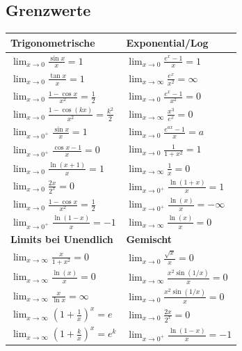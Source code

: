 \begin{flushleft}
 
 \subsection{Grenzwerte}

\begin{center}
  \begin{tabularx}{\linewidth}{XX}
    \toprule
    \textbf{Trigonometrische} & \textbf{Exponential/Log} \\
    \midrule
    $\lim_{x \to 0} \frac{\sin x}{x} = 1$ & $\lim_{x \to 0} \frac{e^x - 1}{x} = 1$ \\
    $\lim_{x \to 0} \frac{\tan x}{x} = 1$ & $\lim_{x \to \infty} \frac{e^x}{x^2} = \infty$ \\
    $\lim_{x \to 0} \frac{1 - \cos x}{x^2} = \frac{1}{2}$ & $\lim_{x \to 0} \frac{e^x - 1}{x^2} = 0$ \\
    $\lim_{x \to 0} \frac{1 - \cos(kx)}{x^2} = \frac{k^2}{2}$ & $\lim_{x \to \infty} \frac{x^3}{e^x} = 0$ \\
    $\lim_{x \to 0^+} \frac{\sin x}{x} = 1$ & $\lim_{x \to 0} \frac{e^{ax} - 1}{x} = a$ \\
    $\lim_{x \to 0^+} \frac{\cos x - 1}{x} = 0$ & $\lim_{x \to 0} \frac{1}{1 + x^2} = 1$ \\
    $\lim_{x \to 0} \frac{\ln(x+1)}{x} = 1$ & $\lim_{x \to \infty} \frac{1}{x} = 0$ \\
    $\lim_{x \to 0} \frac{2x}{2^x} = 0$ & $\lim_{x \to 0^+} \frac{\ln(1+x)}{x} = 1$ \\
    $\lim_{x \to 0} \frac{1 - \cos x}{x^2} = \frac{1}{2}$ & $\lim_{x \to 0^+} \frac{\ln(x)}{x} = -\infty$ \\
    $\lim_{x \to 0^+} \frac{\ln(1 - x)}{x} = -1$ & $\lim_{x \to \infty} \frac{\ln(x)}{x} = 0$ \\
    \midrule
    \textbf{Limits bei Unendlich} & \textbf{Gemischt} \\
    \midrule
    $\lim_{x \to \infty} \frac{x}{1+x^2} = 0$ & $\lim_{x \to 0} \frac{\sqrt{x}}{x} = 0$ \\
    $\lim_{x \to \infty} \frac{\ln(x)}{x} = 0$ & $\lim_{x \to \infty} \frac{x^2 \sin(1/x)}{x} = 0$ \\
    $\lim_{x \to \infty} \frac{x}{\ln x} = \infty$ & $\lim_{x \to 0} \frac{x^2 \sin(1/x)}{x} = 0$ \\
    $\lim_{x \to \infty} \left( 1 + \frac{1}{x} \right)^x = e$ & $\lim_{x \to 0} \frac{2x}{2^x} = 0$ \\
    $\lim_{x \to \infty} \left( 1 + \frac{k}{x} \right)^x = e^{k}$ & $\lim_{x \to 0^+} \frac{\ln(1 - x)}{x} = -1$ \\

\end{tabularx}
\end{center}
\end{flushleft}
